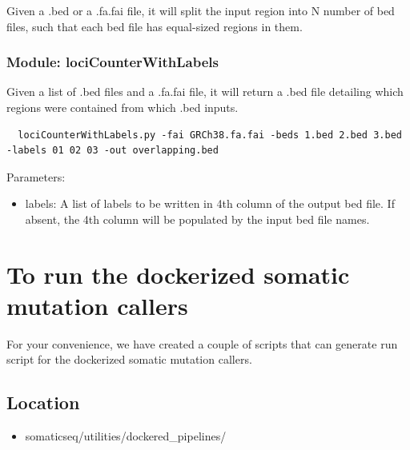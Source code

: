 \documentclass[10pt,letterpaper]{article}
\begin{document}
\begin{sloppypar}
Given a .bed or a .fa.fai file, it will split the input region into N number of bed files, such that each bed file has equal-sized regions in them. 


\subsubsection{Module: lociCounterWithLabels}

Given a list of .bed files and a .fa.fai file, it will return a .bed file detailing which regions were contained from which .bed inputs. 

\begin{lstlisting}
  lociCounterWithLabels.py -fai GRCh38.fa.fai -beds 1.bed 2.bed 3.bed -labels 01 02 03 -out overlapping.bed
\end{lstlisting}

Parameters:

\begin{itemize}

\item labels: A list of labels to be written in 4th column of the output bed file. If absent, the 4th column will be populated by the input bed file names.

\end{itemize}


















\section{To run the dockerized somatic mutation callers} \label{dockerized_callers}

For your convenience, we have created a couple of scripts that can generate run script for the dockerized somatic mutation callers. 

\subsection{Location}

  \begin{itemize}
    \item somaticseq/utilities/dockered\_pipelines/
  \end{itemize}


\end{sloppypar}
\end{document}
